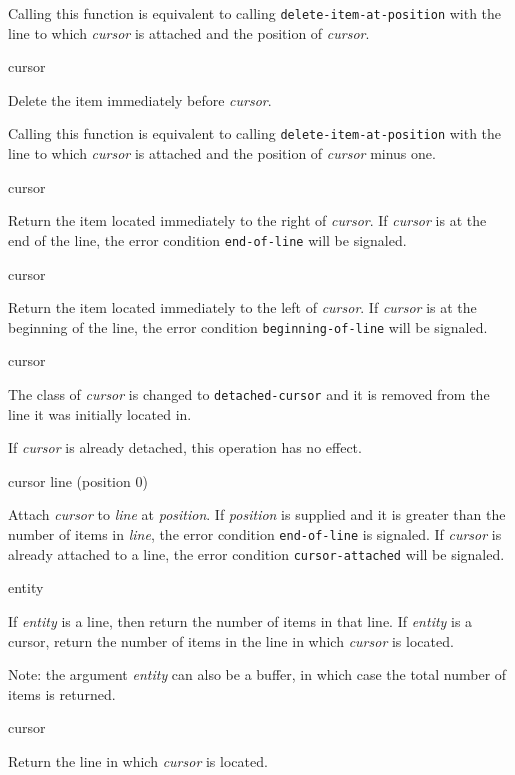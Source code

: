 Calling this function is equivalent to calling
\texttt{delete-item-at-position} with the line to which
\textit{cursor} is attached and the position of \textit{cursor}.
\howeverperformance{}

\ifdetached{}

 {cursor}

Delete the item immediately before \emph{cursor}.

Calling this function is equivalent to calling
\texttt{delete-item-at-position} with the line to which
\textit{cursor} is attached and the position of \textit{cursor} minus
one.  \howeverperformance{}

\ifdetached{}

 {cursor}

Return the item located immediately to the right of \textit{cursor}.
If \emph{cursor} is at the end of the line, the error condition
\texttt{end-of-line} will be signaled.

 {cursor}

Return the item located immediately to the left of \textit{cursor}.
If \emph{cursor} is at the beginning of the line, the error condition
\texttt{beginning-of-line} will be signaled.

 {cursor}

The class of \textit{cursor} is changed to \texttt{detached-cursor}
and it is removed from the line it was initially located in. 

If \textit{cursor} is already detached, this operation has no effect.

 {cursor line \optional (position 0)}

Attach \textit{cursor} to \textit{line} at \textit{position}.  If
\textit{position} is supplied and it is greater than the number of
items in \textit{line}, the error condition \texttt{end-of-line} is
signaled.  If \textit{cursor} is already attached to a line, the error
condition \texttt{cursor-attached} will be signaled.

 {entity}

If \textit{entity} is a line, then return the number of items in that
line.  If \textit{entity} is a cursor, return the number of items in
the line in which \textit{cursor} is located.

Note: the argument \textit{entity} can also be a buffer, in which case
the total number of items is returned.

 {cursor}

Return the line in which \textit{cursor} is located. 
